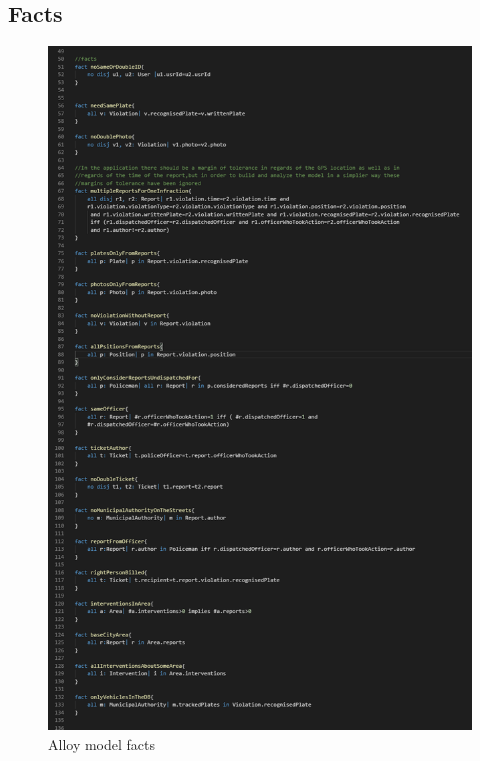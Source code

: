 \subsection{Facts}
\begin{figure}[h!]
	\centering
	\includegraphics[scale=0.58]{Images/Facts_1-2}
	\caption{Alloy model facts}
\end{figure}
\newpage
